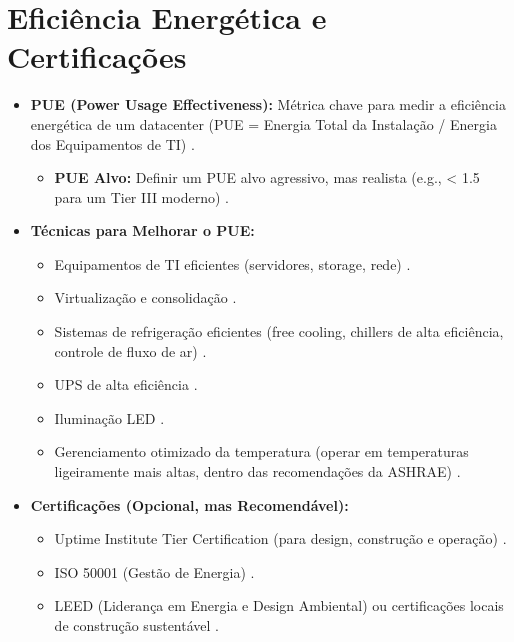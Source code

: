 \documentclass[
	12pt,				%
	oneside,			%
	a4paper,			%
	english,			%
	brazil				%
	]{abntex2unama}
\begin{document}
\section{Eficiência Energética e Certificações}
\begin{itemize}
	\item \textbf{PUE (Power Usage Effectiveness):} Métrica chave para medir a eficiência energética de um datacenter (PUE = Energia Total da Instalação / Energia dos Equipamentos de TI) \cite{energy_efficiency}.
	      \begin{itemize}
		      \item \textbf{PUE Alvo:} Definir um PUE alvo agressivo, mas realista (e.g., < 1.5 para um Tier III moderno) \cite{green_datacenters}.
	      \end{itemize}
	\item \textbf{Técnicas para Melhorar o PUE:}
	      \begin{itemize}
		      \item Equipamentos de TI eficientes (servidores, storage, rede) \cite{capacity_planning}.
		      \item Virtualização e consolidação \cite{containerization}.
		      \item Sistemas de refrigeração eficientes (free cooling, chillers de alta eficiência, controle de fluxo de ar) \cite{cooling_technologies}.
		      \item UPS de alta eficiência \cite{power_distribution}.
		      \item Iluminação LED \cite{green_datacenters}.
		      \item Gerenciamento otimizado da temperatura (operar em temperaturas ligeiramente mais altas, dentro das recomendações da ASHRAE) \cite{energy_efficiency}.
	      \end{itemize}
	\item \textbf{Certificações (Opcional, mas Recomendável):}
	      \begin{itemize}
		      \item Uptime Institute Tier Certification (para design, construção e operação) \cite{reliability_engineering}.
		      \item ISO 50001 (Gestão de Energia) \cite{green_datacenters}.
		      \item LEED (Liderança em Energia e Design Ambiental) ou certificações locais de construção sustentável \cite{energy_efficiency}.
	      \end{itemize}
\end{itemize}
\end{document}
